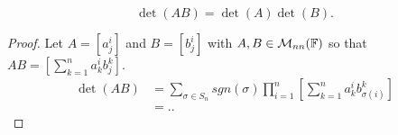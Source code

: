 \begin{lem}
	\[
		\det(AB) = \det(A) \det(B).
	\]
\end{lem}

\begin{proof}
	Let $A=[a^i_j]$ and $B=[b^i_j]$ with $A,B \in \mathcal{M}_{nn}(\mathbb{F})$ so that
	$AB=\left[ \sum_{k=1}^n a^i_k b^k_j \right]$.
	\begin{align*}
		\det(AB)
		&= \sum_{\sigma \in S_n} sgn(\sigma) \prod_{i=1}^{n} \left[ \sum_{k=1}^{n} a^i_k b^k_{\sigma(i)} \right]
		\\
		&= ..
	\end{align*}
\end{proof}

